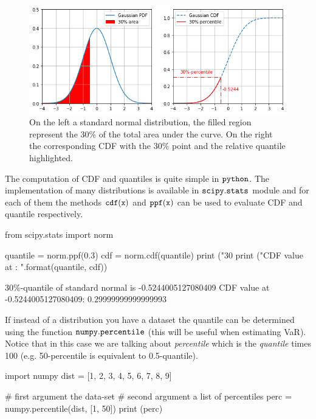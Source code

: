 \begin{figure}[htb]
	\centering
	\includegraphics[width=1.\textwidth]{figures/percentile.png}
	\caption{On the left a standard normal distribution, the filled region represent the 30\% of the total area
		under the curve. On the right the corresponding CDF with the 30\% point and the relative quantile highlighted.}
	\label{fig:percentile}
\end{figure}

The computation of CDF and quantiles is quite simple in \(\tt{python}\). The implementation of many distributions is available in \(\tt{scipy.stats}\) module and for each of them the methods \(\tt{cdf(x)}\) and \(\tt{ppf(x)}\) can be used to evaluate CDF and quantile respectively.

\begin{ipython}
from scipy.stats import norm

quantile = norm.ppf(0.3)
cdf = norm.cdf(quantile)
print ("30%
print ("CDF value at {}: {}".format(quantile, cdf))
\end{ipython}
\begin{ioutput}
30\%-quantile of standard normal is -0.5244005127080409
CDF value at -0.5244005127080409: 0.29999999999999993
\end{ioutput}

If instead of a distribution you have a dataset the quantile can be determined using the function \(\tt{numpy.percentile}\) (this will be useful when estimating VaR). Notice that in this case we are talking about \emph{percentile} which is the \emph{quantile} times 100 (e.g. 50-percentile is equivalent to 0.5-quantile).

\begin{ipython}
import numpy
dist = [1, 2, 3, 4, 5, 6, 7, 8, 9]

# first argument the data-set
# second argument a list of percentiles
perc = numpy.percentile(dist, [1, 50])
print (perc)
\end{ipython}
\begin{ioutput}
[1.08 5.  ]
\end{ioutput}

